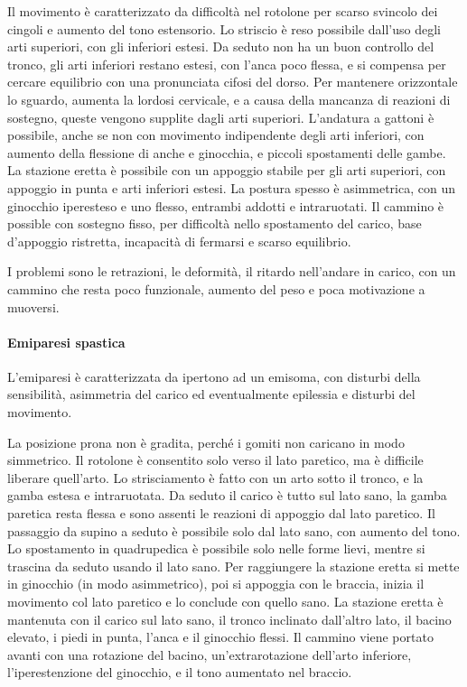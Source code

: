 Il movimento è caratterizzato da difficoltà nel rotolone per scarso svincolo dei cingoli e aumento del tono estensorio. Lo striscio è
reso possibile dall'uso degli arti superiori, con gli inferiori estesi. Da seduto non ha un buon controllo del tronco, gli arti
inferiori restano estesi, con l'anca poco flessa, e si compensa per cercare equilibrio con una pronunciata cifosi del dorso. Per
mantenere orizzontale lo sguardo, aumenta la lordosi cervicale, e a causa della mancanza di reazioni di sostegno, queste vengono
supplite dagli arti superiori. 
L'andatura a gattoni è possibile, anche se non con movimento indipendente degli arti inferiori, con aumento della flessione di anche e
ginocchia, e piccoli spostamenti delle gambe.
La stazione eretta è possibile con un appoggio stabile per gli arti superiori, con appoggio in punta e arti inferiori estesi. La postura
spesso è asimmetrica, con un ginocchio iperesteso e uno flesso, entrambi addotti e intraruotati. 
Il cammino è possible con sostegno fisso, per difficoltà nello spostamento del carico, base d'appoggio ristretta, incapacità di fermarsi
e scarso equilibrio.

I problemi sono le retrazioni, le deformità, il ritardo nell'andare in carico, con un cammino che resta poco funzionale, aumento del 
peso e poca motivazione a muoversi. 

\paragraph{Emiparesi spastica}
L'emiparesi è caratterizzata da ipertono ad un emisoma, con disturbi della sensibilità, asimmetria del carico ed eventualmente epilessia
e disturbi del movimento.

La posizione prona non è gradita, perché i gomiti non caricano in modo simmetrico. Il rotolone è consentito solo verso il lato paretico,
ma è difficile liberare quell'arto. Lo strisciamento è fatto con un arto sotto il tronco, e la gamba estesa e intraruotata. Da seduto il
carico è tutto sul lato sano, la gamba paretica resta flessa e sono assenti le reazioni di appoggio dal lato paretico. Il passaggio da
supino a seduto è possibile solo dal lato sano, con aumento del tono. Lo spostamento in quadrupedica è possibile solo nelle forme lievi,
mentre si trascina da seduto usando il lato sano. Per raggiungere la stazione eretta si mette in ginocchio (in modo asimmetrico), poi si
appoggia con le braccia, inizia il movimento col lato paretico e lo conclude con quello sano.
La stazione eretta è mantenuta con il carico sul lato sano, il tronco inclinato dall'altro lato, il bacino elevato, i piedi in punta,
l'anca e il ginocchio flessi.
Il cammino viene portato avanti con una rotazione del bacino, un'extrarotazione dell'arto inferiore, l'iperestenzione del ginocchio, e
il tono aumentato nel braccio.

